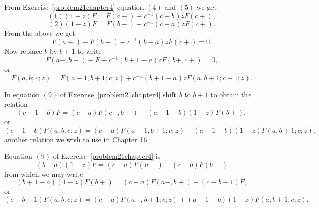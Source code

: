 \begin{solution}
From Exercise~\ref{problem21chapter4} equation $(4)$ and $(5)$ we get
$$(1) (1-z)F=F(a-)-c^{-1}(c-b)zF(c+),$$
$$(2) (1-z)F = F(b-) - c^{-1}(c-a)zF(c+).$$
From the above we get
$$F(a-) - F(b-) + c^{-1}(b-a)zF(c+) = 0.$$
Now replace $b$ by $b+1$ to write
$$F(a-,b+) - F + c^{-1}(b+1-a)zF(b+,c+) = 0,$$
or
$$F(a,b;c;z) = F(a-1,b+1;c;z) + c^{-1}(b+1-a)zF(a,b+1;c+1;z).$$
\end{solution}
\begin{problem}\label{problem23chapter4}
In equation $(9)$ of Exercise~\ref{problem21chapter4} shift $b$ to $b+1$ to obtain the relation
$$(c-1-b)F = (c-a)F(c-,b+)+(a-1-b)(1-z)F(b+),$$
or
$$(c-1-b)F(a,b;c;z) = (c-a)F(a-1,b+1;c;z) + (a-1-b)(1-z)F(a,b+1;c;z),$$
another relation we wish to use in Chapter 16.
\end{problem}
\begin{solution}
Equation $(9)$ of Exercise~\ref{problem21chapter4} is
$$(b-a)(1-z)F = (c-a)F(a-) - (c-b)F(b-)$$
from which we may write
$$(b+1-a)(1-z)F(b+) = (c-a)F(a-,b+) - (c-b-1)F,$$
or
$$(c-b-1)F(a,b;c;z) = (c-a)F(a-,b+1;c;z) + (a-1-b)(1-z)F(a,b+1;c;z).$$
\end{solution}
